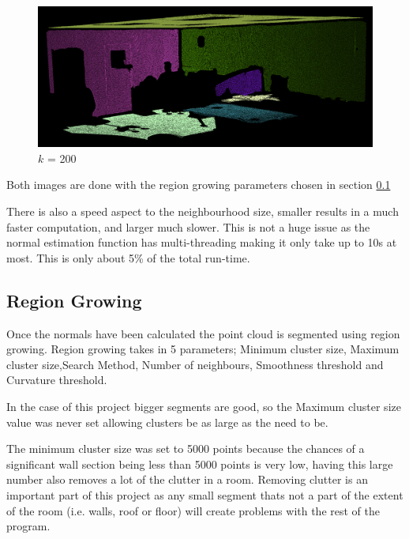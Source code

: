 		\begin{figure}[H]
			\centering
			\includegraphics[width=1\linewidth]{"Includes/images/Normal Comp/k = 200 ver 2"}
			\caption{$k$ = 200}
			\label{fig:k=200}
		\end{figure}
		
		Both images are done with the region growing parameters chosen in section \ref{RegionGrowParams}

		
		There is also a speed aspect to the neighbourhood size, smaller results in a much faster computation, and larger much slower. This is not a huge issue as the normal estimation function has multi-threading making it only take up to 10s at most. This is only about 5\% of the total run-time.
		
		
		\subsection{Region Growing}
		\label{RegionGrowParams}
			
		Once the normals have been calculated the point cloud is segmented using region growing. Region growing takes in 5 parameters; Minimum cluster size, Maximum cluster size,Search Method, Number of neighbours, Smoothness threshold and Curvature threshold.
		
		In the case of this project bigger segments are good, so the Maximum cluster size value was never set allowing clusters be as large as the need to be.
		
		The minimum cluster size was set to 5000 points because the chances of a significant wall section being less than 5000 points is very low, having this large number also removes a lot of the clutter in a room. Removing clutter is an important part of this project as any small segment thats not a part of the extent of the room (i.e. walls, roof or floor) will create problems with the rest of the program.
		
